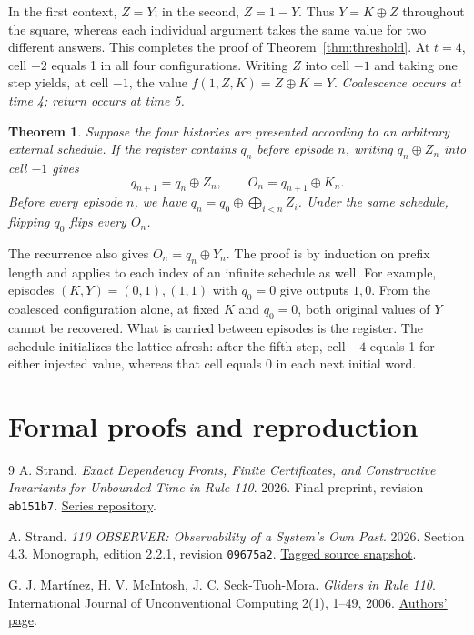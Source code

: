 \documentclass[11pt,a4paper]{article}
\theoremstyle{compact}
\newtheorem{theorem}{Theorem}
\begin{document}
In the first context, $Z=Y$; in the second, $Z=1-Y$. Thus $Y=K\oplus Z$
throughout the square, whereas each individual argument takes the same value
for two different answers. This completes the proof of
Theorem~\ref{thm:threshold}. At $t=4$, cell $-2$ equals 1 in all four
configurations. Writing $Z$ into cell $-1$ and taking one step yields, at cell
$-1$, the value $f(1,Z,K)=Z\oplus K=Y$. \emph{Coalescence occurs at time 4; return occurs at
time 5.}

\begin{theorem}\label{thm:stream}
Suppose the four histories are presented according to an arbitrary external
schedule. If the register contains $q_n$ before episode $n$, writing
$q_n\oplus Z_n$ into cell $-1$ gives
\[
 q_{n+1}=q_n\oplus Z_n,\qquad O_n=q_{n+1}\oplus K_n.
\]
Before every episode $n$, we have
$q_n=q_0\oplus\bigoplus_{i<n} Z_i$. Under the same schedule, flipping $q_0$
flips every $O_n$.
\end{theorem}

The recurrence also gives $O_n=q_n\oplus Y_n$.
The proof is by induction on prefix length and applies to each index of an
infinite schedule as well. For example, episodes $(K,Y)=(0,1),(1,1)$ with
$q_0=0$ give outputs $1,0$. From the coalesced configuration alone, at fixed
$K$ and $q_0=0$, both original values of $Y$ cannot be recovered. What is
carried between episodes is the register. The schedule initializes the lattice
afresh: after the fifth step, cell $-4$ equals 1 for either injected value,
whereas that cell equals 0 in each next initial word.

\clearpage
\section{Formal proofs and reproduction}



\begingroup
\small
\begin{thebibliography}{9}
A. Strand.
\emph{Exact Dependency Fronts, Finite Certificates, and Constructive Invariants
for Unbounded Time in Rule 110}. 2026.
Final preprint, revision \texttt{ab151b7}.
\href{https://github.com/Dnarts/rule110-dependency-fronts}{Series repository}.

A. Strand. \emph{110 OBSERVER: Observability of a System's Own Past}.
2026. Section 4.3. Monograph, edition 2.2.1, revision \texttt{09675a2}.
\href{https://github.com/Dnarts/rule110-dependency-fronts/tree/v2.2.1-monograph-multilingual}{Tagged source snapshot}.

G. J. Mart\'inez, H. V. McIntosh, J. C. Seck-Tuoh-Mora.
\emph{Gliders in Rule 110}. International Journal of Unconventional Computing
2(1), 1--49, 2006.
\href{https://www.uaeh.edu.mx/investigacion/productos/5189/}{Authors' page}.
\end{thebibliography}
\endgroup
\end{document}
